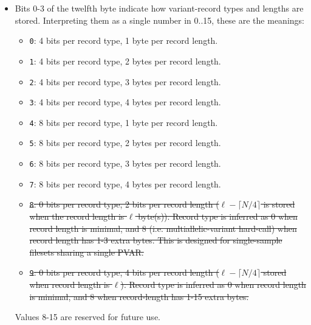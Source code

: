 \documentclass[8pt]{article}
\begin{document}
\begin{itemize}
  \itemsep0em
\item Bits 0-3 of the twelfth byte indicate how variant-record types and
  lengths are stored.  Interpreting them as a single number in 0..15, these are
  the meanings:
  \begin{itemize}
  \item \texttt{0}: 4 bits per record type, 1 byte per record length.
  \item \texttt{1}: 4 bits per record type, 2 bytes per record length.
  \item \texttt{2}: 4 bits per record type, 3 bytes per record length.
  \item \texttt{3}: 4 bits per record type, 4 bytes per record length.
  \item \texttt{4}: 8 bits per record type, 1 byte per record length.
  \item \texttt{5}: 8 bits per record type, 2 bytes per record length.
  \item \texttt{6}: 8 bits per record type, 3 bytes per record length.
  \item \texttt{7}: 8 bits per record type, 4 bytes per record length.
  \item \sout{\texttt{8}: 0 bits per record type, 2 bits per record length ($\ell
    -\lceil N/4\rceil$ is stored when the record length is $\ell$ byte(s)).
    Record type is inferred as 0 when record length is minimal, and 8 (i.e.
    multiallelic-variant hard-call) when record length has 1-3 extra bytes.
    This is designed for single-sample filesets sharing a single PVAR.}
  \item \sout{\texttt{9}: 0 bits per record type, 4 bits per record length ($\ell
    -\lceil N/4\rceil$ stored when record length is $\ell$).  Record type is
    inferred as 0 when record length is minimal, and 8 when record-length has
    1-15 extra bytes.}
  \end{itemize}
  Values 8-15 are reserved for future use.


\end{itemize}
\end{document}
